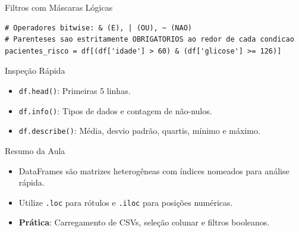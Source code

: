 \documentclass[aspectratio=169, 10pt]{beamer}
\begin{document}
\begin{frame}[fragile]{Filtros com Máscaras Lógicas}
  \begin{lstlisting}
# Operadores bitwise: & (E), | (OU), ~ (NAO)
# Parenteses sao estritamente OBRIGATORIOS ao redor de cada condicao
pacientes_risco = df[(df['idade'] > 60) & (df['glicose'] >= 126)]
  \end{lstlisting}
  \begin{block}{Inspeção Rápida}
    \begin{itemize}
      \item \texttt{df.head()}: Primeiras 5 linhas.
      \item \texttt{df.info()}: Tipos de dados e contagem de não-nulos.
      \item \texttt{df.describe()}: Média, desvio padrão, quartis, mínimo e máximo.
    \end{itemize}
  \end{block}
\end{frame}

\begin{frame}{Resumo da Aula}
  \begin{itemize}
    \item DataFrames são matrizes heterogêneas com índices nomeados para análise rápida.
    \item Utilize \texttt{.loc} para rótulos e \texttt{.iloc} para posições numéricas.
    \item \textbf{Prática}: Carregamento de CSVs, seleção colunar e filtros booleanos.
  \end{itemize}
\end{frame}
\end{document}
